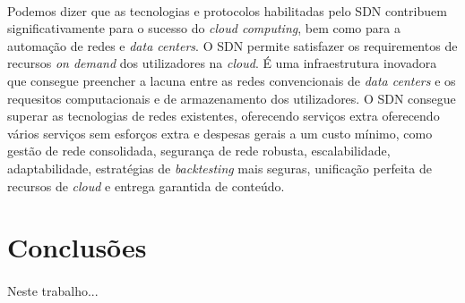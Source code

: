 \documentclass{llncs}
\begin{document}
\paragraph{}
Podemos dizer que as tecnologias e protocolos habilitadas pelo SDN contribuem significativamente para o sucesso do \textit {cloud computing}, bem como para a automação de redes e \textit {data centers}. O SDN permite satisfazer os requirementos de recursos \textit{on demand} dos utilizadores na \textit{cloud}. 
É uma infraestrutura inovadora que consegue preencher a lacuna entre as redes convencionais de \textit{data centers} e os requesitos computacionais e de armazenamento dos utilizadores.
O SDN consegue superar as tecnologias de redes existentes, oferecendo serviços extra oferecendo vários serviços sem esforços extra e despesas gerais a um custo mínimo, como gestão de rede consolidada, segurança de rede robusta, escalabilidade, adaptabilidade, estratégias de \textit {backtesting} mais seguras, unificação perfeita de recursos de \textit{cloud} e entrega garantida de conteúdo.








\section{Conclusões}
\paragraph{}
Neste trabalho...

\printbibliography
\end{document}
